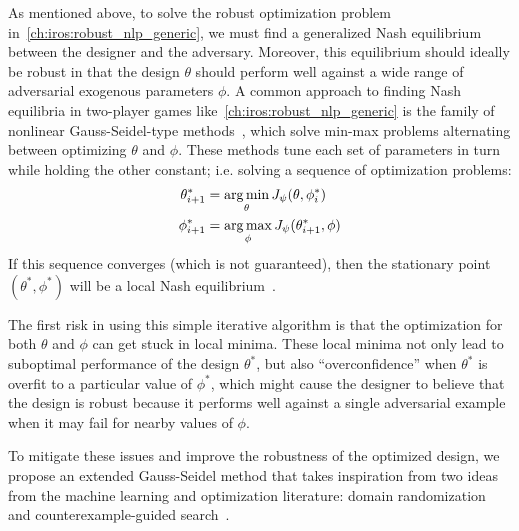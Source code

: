 As mentioned above, to solve the robust optimization problem in~\eqref{ch:iros:robust_nlp_generic}, we must find a generalized Nash equilibrium between the designer and the adversary. Moreover, this equilibrium should ideally be robust in that the design $\theta$ should perform well against a wide range of adversarial exogenous parameters $\phi$.
%
A common approach to finding Nash equilibria in two-player games like~\eqref{ch:iros:robust_nlp_generic} is the family of nonlinear Gauss-Seidel-type methods~\cite{facchineiGeneralizedNashEquilibrium2007}, which solve min-max problems alternating between optimizing $\theta$ and $\phi$. These methods tune each set of parameters in turn while holding the other constant; i.e. solving a sequence of optimization problems:
\begin{subequations}
	\begin{align}\label{ch:iros:eq:gauss_seidel}
		\theta^*_{i+1} & = \operatorname*{arg\,min}_\theta J_\psi(\theta, \phi^*_i)   \\
		\phi^*_{i+1}   & = \operatorname*{arg\,max}_\phi J_\psi(\theta^*_{i+1}, \phi)
	\end{align}
\end{subequations}
%
If this sequence converges (which is not guaranteed), then the stationary point $(\theta^*, \phi^*)$ will be a local Nash equilibrium~\cite{facchineiGeneralizedNashEquilibrium2007}.

The first risk in using this simple iterative algorithm is that the optimization for both $\theta$ and $\phi$ can get stuck in local minima. These local minima not only lead to suboptimal performance of the design $\theta^*$, but also ``overconfidence'' when $\theta^*$ is overfit to a particular value of $\phi^*$, which might cause the designer to believe that the design is robust because it performs well against a single adversarial example when it may fail for nearby values of $\phi$.
%


To mitigate these issues and improve the robustness of the optimized design, we propose an extended Gauss-Seidel method that takes inspiration from two ideas from the machine learning and optimization literature: domain randomization and counterexample-guided search~\cite{tobinDomainRandomizationTransferring2017,changNeuralLyapunovControl2019}.

